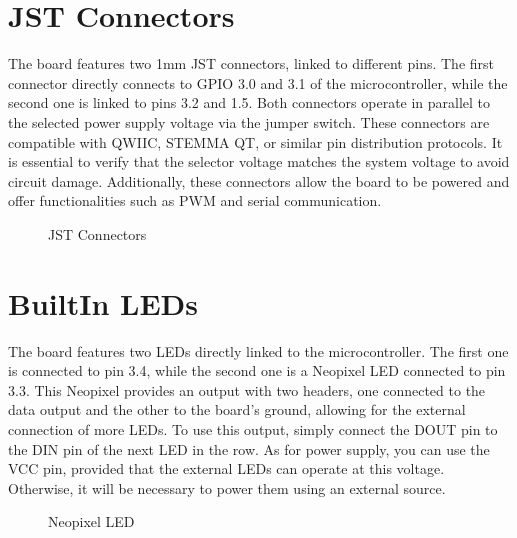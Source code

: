\documentclass[letterpaper,10pt,english]{sphinxmanual}
\begin{document}
\section{JST Connectors}
\label{\detokenize{generalboardcontrol:jst-connectors}}
\sphinxAtStartPar
The board features two 1mm JST connectors, linked to different pins. The first connector directly connects to GPIO 3.0 and 3.1 of the microcontroller, while the second one is linked to pins 3.2 and 1.5. Both connectors operate in parallel to the selected power supply voltage via the jumper switch. These connectors are compatible with QWIIC, STEMMA QT, or similar pin distribution protocols. It is essential to verify that the selector voltage matches the system voltage to avoid circuit damage. Additionally, these connectors allow the board to be powered and offer functionalities such as PWM and serial communication.

\begin{figure}[htbp]
\centering
\capstart

\noindent{}
\caption{JST Connectors}\label{\detokenize{generalboardcontrol:id3}}\label{\detokenize{generalboardcontrol:jst}}\end{figure}


\section{Built\sphinxhyphen{}In LEDs}
\label{\detokenize{generalboardcontrol:built-in-leds}}
\sphinxAtStartPar
The board features two LEDs directly linked to the microcontroller. The first one is connected to pin 3.4, while the second one is a Neopixel LED connected to pin 3.3. This Neopixel provides an output with two headers, one connected to the data output and the other to the board’s ground, allowing for the external connection of more LEDs. To use this output, simply connect the DOUT pin to the DIN pin of the next LED in the row. As for power supply, you can use the VCC pin, provided that the external LEDs can operate at this voltage. Otherwise, it will be necessary to power them using an external source.

\begin{figure}[htbp]
\centering
\capstart

\noindent{}
\caption{Neopixel LED}\label{\detokenize{generalboardcontrol:id4}}\label{\detokenize{generalboardcontrol:neopixel}}\end{figure}
\end{document}
